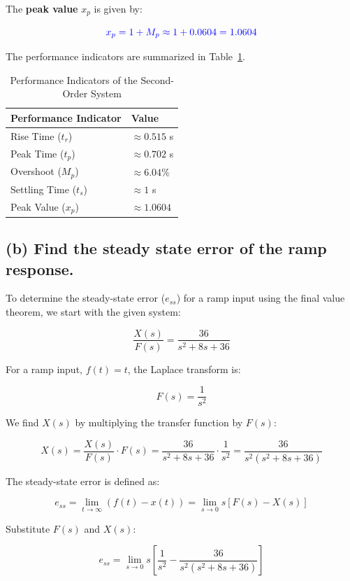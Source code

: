 \documentclass{article}
\begin{document}
The \textbf{peak value} \( x_p \) is given by:

\[
	\textcolor{blue}{x_p = 1 + M_p \approx 1 + 0.0604 = 1.0604}
\]

The performance indicators are summarized in Table~\ref{tab:performance_indicators}.
\begin{table}[h!]
	\centering
	\begin{tabular}{@{}ll@{}}
		\toprule
		\textbf{Performance Indicator} & \textbf{Value}    \\ \midrule
		Rise Time (\( t_r \))          & $\approx 0.515$ s \\
		Peak Time (\( t_p \))          & $\approx 0.702$ s \\
		Overshoot (\( M_p \))          & $\approx 6.04\%$  \\
		Settling Time (\( t_s \))      & $\approx 1$ s     \\
		Peak Value (\( x_p \))         & $\approx 1.0604$  \\ \bottomrule
	\end{tabular}
	\caption{Performance Indicators of the Second-Order System}
	\label{tab:performance_indicators}
\end{table}

\newpage
\subsection*{(b) Find the steady state error of the ramp response.}
To determine the steady-state error (\( e_{ss} \)) for a ramp input using the final value theorem, we start with the given system:

\[
	\frac{X(s)}{F(s)} = \frac{36}{s^2 + 8s + 36}
\]

For a ramp input, \( f(t) = t \), the Laplace transform is:

\[
	F(s) = \frac{1}{s^2}
\]

We find \( X(s) \) by multiplying the transfer function by \( F(s) \):

\[
	X(s) = \frac{X(s)}{F(s)} \cdot F(s) = \frac{36}{s^2 + 8s + 36} \cdot \frac{1}{s^2} = \frac{36}{s^2 (s^2 + 8s + 36)}
\]

The steady-state error is defined as:

\[
	e_{ss} = \lim_{t \to \infty} (f(t) - x(t)) = \lim_{s \to 0} s \left[ F(s) - X(s) \right]
\]

Substitute \( F(s) \) and \( X(s) \):

\[
	e_{ss} = \lim_{s \to 0} s \left[ \frac{1}{s^2} - \frac{36}{s^2 (s^2 + 8s + 36)} \right]
\]
\end{document}
